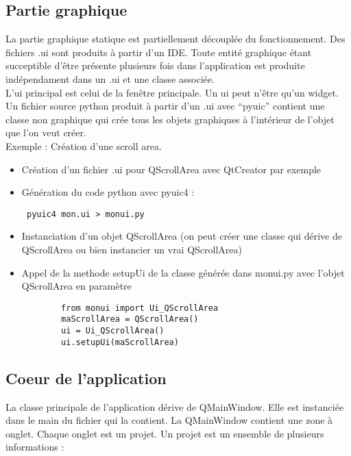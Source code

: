 \documentclass[12pt,a4paper]{article}
\begin{document}
    \subsection{Partie graphique}
        La partie graphique statique est partiellement découplée du
        fonctionnement. Des
        fichiers .ui sont produits à partir d'un IDE. Toute entité graphique
        étant succeptible d'être présente plusieurs fois dans l'application est
        produite indépendament dans un .ui et une classe associée.\\
        
        L'ui principal est celui de la fenêtre principale.  Un ui peut n'être
        qu'un widget. Un fichier source python produit à partir d'un .ui avec
        ``pyuic'' contient une classe non graphique qui crée tous les objets
        graphiques à l'intérieur de l'objet que l'on veut créer.\\

        Exemple : Création d'une scroll area.\\
        \begin{itemize}
            \item Création d'un fichier .ui pour QScrollArea avec QtCreator par
                exemple
            \item Génération du code python avec pyuic4 :\begin{verbatim} pyuic4 mon.ui > monui.py \end{verbatim}
            \item Instanciation d'un objet QScrollArea (on peut créer une classe qui dérive de QScrollArea ou bien instancier un vrai QScrollArea)
            \item Appel de la methode setupUi de la classe générée dans monui.py avec l'objet QScrollArea en paramètre
                \begin{verbatim}
        from monui import Ui_QScrollArea
        maScrollArea = QScrollArea()
        ui = Ui_QScrollArea()
        ui.setupUi(maScrollArea)
\end{verbatim}
        \end{itemize}
    \subsection{Coeur de l'application}
        La classe principale de l'application dérive de QMainWindow. Elle est
        instanci\'ee dans le main du fichier qui la contient. La QMainWindow
        contient une zone à onglet. Chaque onglet est un projet. Un projet est
        un ensemble de plusieurs informations :\\
\end{document}
